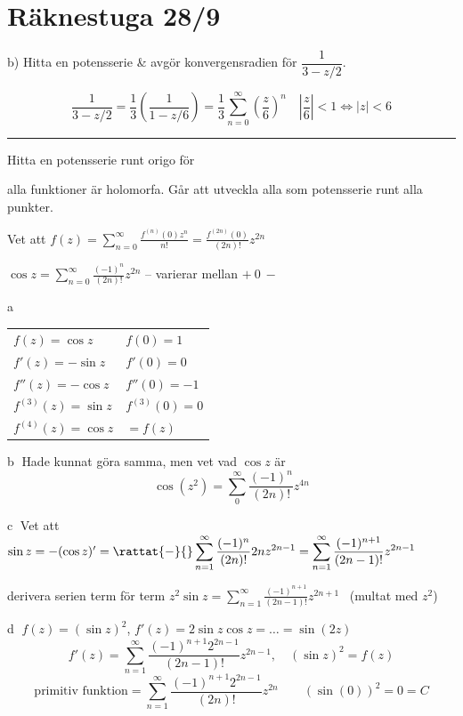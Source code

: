 \section{Räknestuga 28/9}

 \quad b) Hitta en potensserie \& avgör konvergensradien för $\dfrac{1}{3 - z/2}$. 

\hfill {}
\[ \frac{1}{3 - z/2} = \frac{1}{3}\left( \frac{1}{1 - z/6} \right) = \frac{1}{3} \sum_{n = 0}^\infty \left( \frac{z}{6} \right)^n \quad \left| \frac{z}{6} \right| < 1 \Leftrightarrow |z| < 6 \]

\noindent\rule{\linewidth}{0.4pt}

 \quad Hitta en potensserie runt origo för \ 

\textcolor{blue!60!black}{alla funktioner är holomorfa. Går att utveckla alla som potensserie runt alla punkter.}

Vet att $f(z) = \displaystyle\sum_{n = 0}^\infty \frac{f^{(n)}(0)z^n}{n!} = \frac{f^{(2n)}(0)}{(2n)!} z^{2n}$

$\cos z = \displaystyle\sum_{n = 0}^\infty \frac{(-1)^n}{(2n)!} z^{2n}$ \quad \textcolor{magenta!80!black}{-- varierar mellan $+ \ 0 \ -$}

\textcircled{a}
\begin{tabular}{ll}
  $f(z) = \cos z$ & $f(0) = 1$ \\
  $f'(z) = -\sin z$ & $f'(0) = 0$ \\
  $f''(z) = -\cos z$ & $f''(0) = -1$ \\
  $f^{(3)}(z) = \sin z$ & $f^{(3)}(0) = 0$ \\
  $f^{(4)}(z) = \cos z$ & $= f(z)$
\end{tabular}

\textcircled{b} \textcolor{blue!60!black}{Hade kunnat göra samma, men vet vad $\cos z$ är}
\[ \cos(z^2) = \sum_0^\infty \frac{(-1)^n}{(2n)!} z^{4n} \]

\textcircled{c} Vet att $\sin z = -(\cos z)' = \rattat{-}{}\displaystyle\sum_{n = 1}^\infty \frac{(-1)^n}{(2n)!} 2n z^{2n-1} = \sum_{n = 1}^\infty \frac{(-1)^{n+1}}{(2n - 1)!} z^{2n-1}$

\textcolor{blue!60!black}{derivera serien term för term} \qquad $z^2 \sin z = \displaystyle\sum_{n = 1}^\infty \frac{(-1)^{n+1}}{(2n - 1)!} z^{2n+1}$ \ \textcolor{blue!60!black}{(multat med $z^2$)}

\textcircled{d} $f(z) = (\sin z)^2$, $f'(z) = 2 \sin z \cos z = \dots = \sin(2z)$
\[ f'(z) = \sum_{n = 1}^\infty \frac{(-1)^{n+1} 2^{2n-1}}{(2n - 1)!} z^{2n-1}, \quad (\sin z)^2 = f(z) \]
\[ \text{primitiv funktion} = \sum_{n = 1}^\infty \frac{(-1)^{n+1} 2^{2n-1}}{(2n)!} z^{2n} \qquad (\sin(0))^2 = 0 = C \]
